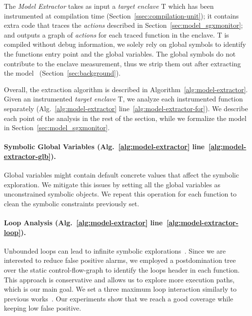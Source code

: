 The \emph{Model Extractor} takes as input a \emph{target enclave} T which has 
been instrumented at compilation time (Section~\ref{ssec:compilation-unit});
\ie it contains extra code that traces the \emph{actions} described in 
Section~\ref{sec:model_sgxmonitor}; and outputs a graph of \emph{actions} for 
each traced 
function in the enclave.
T is compiled without debug information, we solely rely on global symbols to 
identify the functions entry point and the global variables.
The global symbols do not contribute to the enclave measurement, thus we strip 
them out after extracting the model~\citep{intel2} 
(Section~\ref{sec:background}). 

Overall, the extraction algorithm is described in 
Algorithm~\ref{alg:model-extractor}. Given an instrumented \emph{target 
	enclave} T, we analyze each instrumented function separately 
(Alg.~\ref{alg:model-extractor} line~\ref{alg:model-extractor-for}).
We describe each point of the analysis in the rest of the section, while we 
formalize the model in Section~\ref{sec:model_sgxmonitor}.

\paragraph{Symbolic Global Variables (Alg.~\ref{alg:model-extractor} 
	line~\ref{alg:model-extractor-glb}).} 
Global variables might contain default concrete values that affect the symbolic 
exploration.
We mitigate this issues by setting all the global variables as unconstrained
symbolic objects. 
We repeat this operation for each function to clean the symbolic constraints 
previously set. 

\paragraph{Loop Analysis (Alg.~\ref{alg:model-extractor} 
	line~\ref{alg:model-extractor-loop}).}

Unbounded loops can lead to infinite symbolic 
explorations~\citep{10.1007/978-3-642-36742-7_47}.
Since we are interested to reduce false positive alarms, we employed a 
postdomination tree~\citep{dominators} over the static control-flow-graph to 
identify the loops header in each function.
This approach is conservative and allows us to explore more execution paths, 
which is our main goal.
We set a three maximum loop interaction similarly to previous 
works~\citep{wang2009intscope}.
Our experiments show that we reach a good coverage while keeping low false 
positive.

